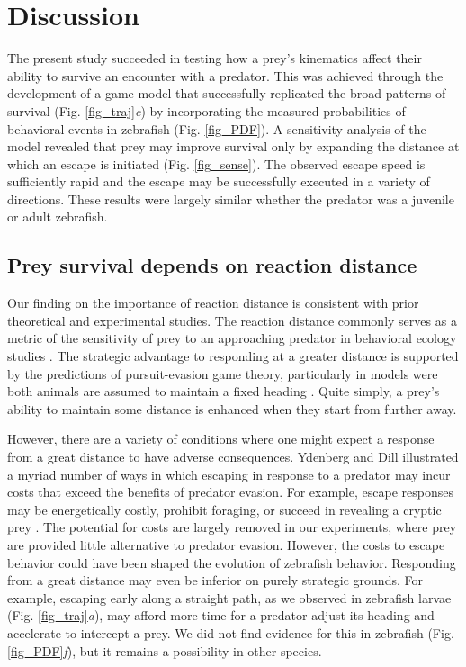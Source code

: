 \documentclass[]{rsos}%
\begin{document}
\section{Discussion}%

The present study succeeded in testing how a prey's kinematics affect their ability to survive an encounter with a predator.
This was achieved through the development of a game model that successfully replicated the broad patterns of survival (Fig. \ref{fig_traj}\textit{c}) by incorporating the measured probabilities of behavioral events in zebrafish (Fig. \ref{fig_PDF}).
A sensitivity analysis of the model revealed that prey may improve survival only by expanding the distance at which an escape is initiated (Fig. \ref{fig_sense}). 
The observed escape speed is sufficiently rapid and the escape may be successfully executed in a variety of directions.
These results were largely similar whether the predator was a juvenile or adult zebrafish.


\subsection{Prey survival depends on reaction distance} 

Our finding on the importance of reaction distance is consistent with prior theoretical and experimental studies.
The reaction distance commonly serves as a metric of the sensitivity of prey to an approaching predator in behavioral ecology studies \cite{Cooper:2015vf}.
The strategic advantage to responding at a greater distance is supported by the predictions of pursuit-evasion game theory, particularly in models were both animals are assumed to maintain a fixed heading \cite{Isaacs:1965uz,Weihs:1984tb,Soto:2015cj}. 
Quite simply, a prey's ability to maintain some distance is enhanced when they start from further away.

However, there are a variety of conditions where one might expect a response from a great distance to have adverse consequences.
Ydenberg and Dill \cite{Ydenberg:1986tm} illustrated a myriad number of ways in which escaping in response to a predator may incur costs that exceed the benefits of predator evasion.
For example, escape responses may be energetically costly, prohibit foraging, or succeed in revealing a cryptic prey \cite{Cooper:2015vf,Broom:2005gq}.
The potential for costs are largely removed in our experiments, where prey are provided little alternative to predator evasion.
However, the costs to escape behavior could have been shaped the evolution of zebrafish behavior.
Responding from a great distance may even be inferior on purely strategic grounds. 
For example, escaping early along a straight path, as we observed in zebrafish larvae (Fig. \ref{fig_traj}\textit{a}), may afford more time for a predator adjust its heading and accelerate to intercept a prey. 
We did not find evidence for this in zebrafish (Fig. \ref{fig_PDF}\textit{f}), but it remains a possibility in other species.
\end{document}
